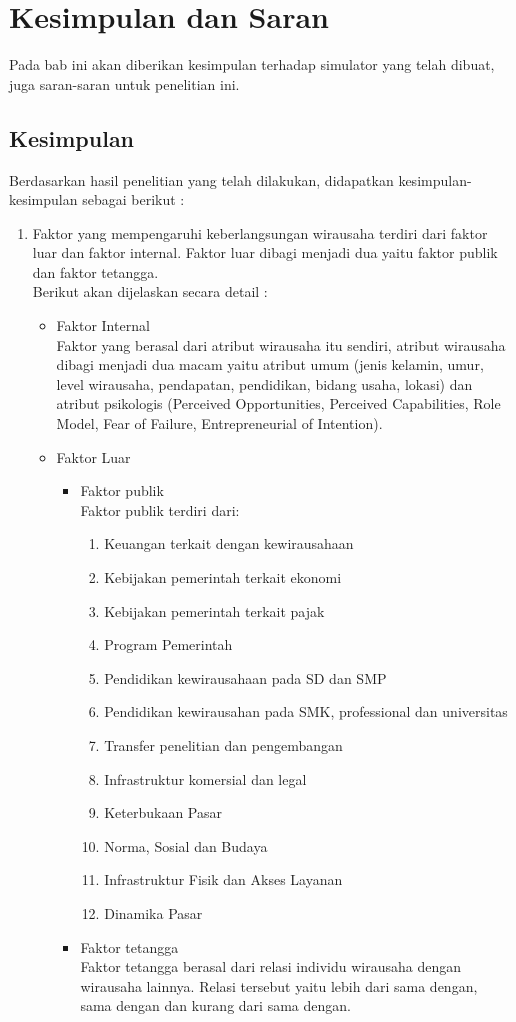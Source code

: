 \chapter{Kesimpulan dan Saran}
\label{chap:kesimpulan}

Pada bab ini akan diberikan kesimpulan terhadap simulator yang telah dibuat, juga saran-saran untuk penelitian ini.

\section{Kesimpulan}
Berdasarkan hasil penelitian yang telah dilakukan, didapatkan kesimpulan-kesimpulan sebagai berikut :
\begin{enumerate}
	\item Faktor yang mempengaruhi keberlangsungan wirausaha terdiri dari faktor luar dan faktor internal. Faktor luar dibagi menjadi dua yaitu faktor publik dan faktor tetangga.\\
Berikut akan dijelaskan secara detail :
	\begin{itemize}
		\item Faktor Internal\\
		Faktor yang berasal dari atribut wirausaha itu sendiri, atribut wirausaha dibagi menjadi dua macam yaitu atribut umum (jenis kelamin, umur, level wirausaha, pendapatan, pendidikan, bidang usaha, lokasi) dan atribut psikologis (Perceived Opportunities, Perceived Capabilities, Role Model, Fear of Failure, Entrepreneurial of Intention).
		\item Faktor Luar
		\begin{itemize}
			\item Faktor publik\\
			Faktor publik terdiri dari:
			\begin{enumerate}
				\item Keuangan terkait dengan kewirausahaan
				\item Kebijakan pemerintah terkait ekonomi
				\item Kebijakan pemerintah terkait pajak
				\item Program Pemerintah
				\item Pendidikan kewirausahaan pada SD dan SMP
				\item Pendidikan kewirausahan pada SMK, professional dan universitas
				\item Transfer penelitian dan pengembangan
				\item Infrastruktur komersial dan legal
				\item Keterbukaan Pasar
				\item Norma, Sosial dan Budaya
				\item Infrastruktur Fisik dan Akses Layanan
				\item Dinamika Pasar
			\end{enumerate}
			\item Faktor tetangga\\
			Faktor tetangga berasal dari relasi individu wirausaha dengan wirausaha lainnya. Relasi tersebut yaitu lebih dari sama dengan, sama dengan dan kurang dari sama dengan. 
		\end{itemize}
	\end{itemize}
	

\end{enumerate}
